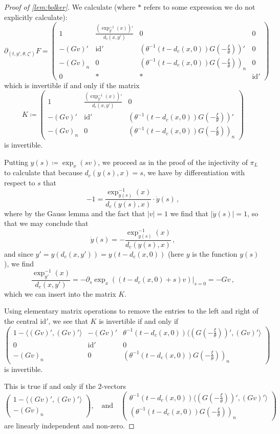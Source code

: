 \documentclass[
	fontsize=11pt, 
	twoside=false, 
	abstract=true, 
	a4paper,
]{scrartcl}
\newcommand{\abs}[1]{\left\lvert#1\right\rvert}
\newcommand{\del}{\partial}
\newcommand{\an}{\quad\text{and}\quad}
\newcommand{\id}{\mathrm{id}}
\begin{document}
\begin{proof}[Proof of \cref{lem:bolker}]
	We calculate (where $\ast$ refers to some expression we do not explicitly calculate):
	\[
		\del_{(t,y',\theta,\zeta')}F = \begin{pmatrix} 1 & \frac{(\exp_{y'}^{-1}(x))'}{d_c(x,y')} & 0 & 0 \\
		-(Gv)' & \id' & (\theta^{-1}(t-d_c(x,0))G(-\frac{\xi}{\theta}))' & 0 \\
		-(Gv)_n & 0 & (\theta^{-1}(t-d_c(x,0))G(-\frac{\xi}{\theta}))_n & 0 \\
		0 & \ast & \ast & \id'\end{pmatrix}
	\]
	which is invertible if and only if the matrix
	\[
		K \coloneqq \begin{pmatrix} 1 & \frac{(\exp_{y'}^{-1}(x))'}{d_c(x,y')} & 0  \\
		-(Gv)' & \id' & (\theta^{-1}(t-d_c(x,0))G(-\frac{\xi}{\theta}))'  \\
		-(Gv)_n & 0 & (\theta^{-1}(t-d_c(x,0))G(-\frac{\xi}{\theta}))_n\end{pmatrix}
	\]
	is invertible.


	Putting $y(s) \coloneqq \exp_x(s v)$, we proceed as in the proof of the injectivity of $\pi_L$ to calculate that because $d_c(y(s),x) = s$, we have by differentiation with respect to $s$ that
	\[
		-1 = \frac{\exp_{y(s)}^{-1}(x)}{d_c(y(s),x)}\cdot \dot y(s)\,,
	\]
	where by the Gauss lemma and the fact that $\abs{v}=1$ we find that $\abs{\dot y(s)}=1$, so that we may conclude that 
	\[
		\dot y(s) = -\frac{\exp_{y(s)}^{-1}(x)}{d_c(y(s),x)}\,,
	\]
	and since $y' = y(d_c(x,y')) = y(t-d_c(x,0))$ (here $y$ is the function $y(s)$), we find
	\[
		\frac{\exp_{y'}^{-1}(x)}{d_c(x,y')} = -\del_s \exp_x((t-d_c(x,0)+s)v)\vert_{s=0} = -Gv\,,
	\]
	which we can insert into the matrix $K$.

	Using elementary matrix operations to remove the entries to the left and right of the central $\id'$, we see that $K$ is invertible if and only if 
	\[
		\begin{pmatrix} 1- \langle (Gv)',(Gv)'\rangle & -(Gv)' & \theta^{-1}(t-d_c(x,0))\langle (G(-\frac{\xi}{\theta}))',(Gv)'\rangle  \\
		0 & \id' & 0  \\
		-(Gv)_n & 0 & (\theta^{-1}(t-d_c(x,0))G(-\frac{\xi}{\theta}))_n\end{pmatrix}
	\]
	is invertible.

	This is true if and only if the $2$-vectors
	\[
		\begin{pmatrix} 1- \langle (Gv)',(Gv)'\rangle  \\ -(Gv)_n \end{pmatrix},\an\begin{pmatrix} \theta^{-1}(t-d_c(x,0))\langle (G(-\frac{\xi}{\theta}))',(Gv)'\rangle \\ (\theta^{-1}(t-d_c(x,0))G(-\frac{\xi}{\theta}))_n\end{pmatrix}
	\]
	are linearly independent and non-zero. 


\end{proof}
\end{document}
